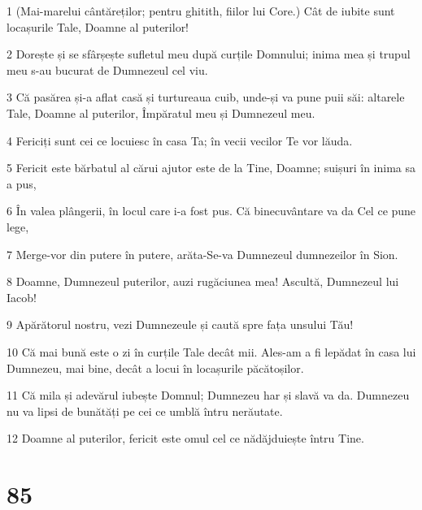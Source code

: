 \par 1 (Mai-marelui cântăreților; pentru ghitith, fiilor lui Core.) Cât de iubite sunt locașurile Tale, Doamne al puterilor!
\par 2 Dorește și se sfârșește sufletul meu după curțile Domnului; inima mea și trupul meu s-au bucurat de Dumnezeul cel viu.
\par 3 Că pasărea și-a aflat casă și turtureaua cuib, unde-și va pune puii săi: altarele Tale, Doamne al puterilor, Împăratul meu și Dumnezeul meu.
\par 4 Fericiți sunt cei ce locuiesc în casa Ta; în vecii vecilor Te vor lăuda.
\par 5 Fericit este bărbatul al cărui ajutor este de la Tine, Doamne; suișuri în inima sa a pus,
\par 6 În valea plângerii, în locul care i-a fost pus. Că binecuvântare va da Cel ce pune lege,
\par 7 Merge-vor din putere în putere, arăta-Se-va Dumnezeul dumnezeilor în Sion.
\par 8 Doamne, Dumnezeul puterilor, auzi rugăciunea mea! Ascultă, Dumnezeul lui Iacob!
\par 9 Apărătorul nostru, vezi Dumnezeule și caută spre fața unsului Tău!
\par 10 Că mai bună este o zi în curțile Tale decât mii. Ales-am a fi lepădat în casa lui Dumnezeu, mai bine, decât a locui în locașurile păcătoșilor.
\par 11 Că mila și adevărul iubește Domnul; Dumnezeu har și slavă va da. Dumnezeu nu va lipsi de bunătăți pe cei ce umblă întru nerăutate.
\par 12 Doamne al puterilor, fericit este omul cel ce nădăjduiește întru Tine.

\chapter{85}

